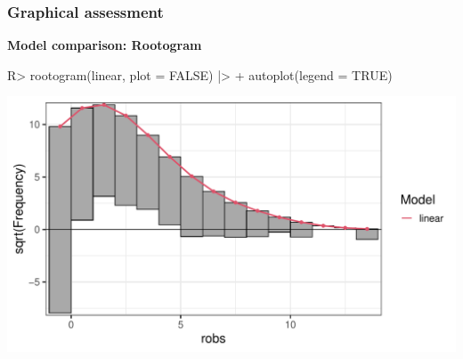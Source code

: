 \documentclass[11pt,t,usepdftitle=false,aspectratio=169]{beamer}
\begin{document}
\begin{frame}[fragile]
\frametitle{Graphical assessment}

\vspace{-0.75em}

\textbf{Model comparison: Rootogram}

\vspace{0.5em}

\begin{Schunk}
\begin{Sinput}
R> rootogram(linear, plot = FALSE) |>
+    autoplot(legend = TRUE)
\end{Sinput}
\end{Schunk}

\begin{center}
\includegraphics{slides-rain_topmodels_lm_rootogram1}
\end{center}

\end{frame}
\end{document}
